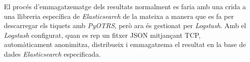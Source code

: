 El procés d'emmagatzematge dels resultats normalment es faria amb una crida a una llibreria específica de \textit{Elasticsearch} de la mateixa a manera que es fa per descarregar els tiquets amb \textit{PyOTRS}, però ara és gestionat per \textit{Logstash}. Amb el \textit{Logstash} configurat, quan es rep un fitxer JSON mitjançant TCP, automàticament anonimitza, distribueix i emmagatzema el resultat en la base de dades \textit{Elasticsearch} especificada.